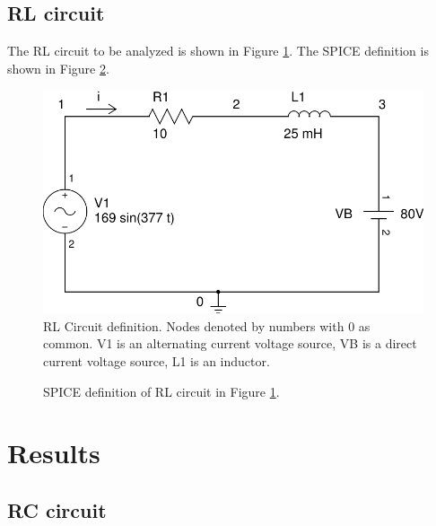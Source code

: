 \documentclass{article}
\begin{document}
\clearpage


\subsection{RL circuit}

The RL circuit to be analyzed is shown in Figure \ref{fig:rlcircuit}.
The SPICE definition is shown in Figure \ref{fig:rlspice}.

\begin{figure}[!hbtp]
\center
\includegraphics[scale=0.5]{spice/rl_circuit-01}
\caption{RL Circuit definition.
Nodes denoted by numbers with 0 as common.
V1 is an alternating current voltage source, VB is a direct current
voltage source, L1 is an inductor.}
\label{fig:rlcircuit}
\end{figure}

\begin{figure}[!hbtp]

\caption{SPICE definition of RL circuit in Figure \ref{fig:rlcircuit}.}
\label{fig:rlspice}
\end{figure}


\clearpage

\section{Results}

\subsection{RC circuit}
\end{document}
